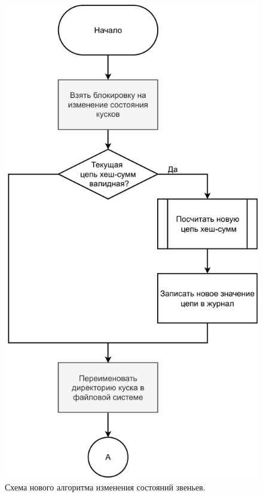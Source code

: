 \begin{figure}[hbtp]
	\centering
	\includegraphics[scale=0.8]{img/mainalgo.pdf}
	\caption{Схема нового алгоритма изменения состояний звеньев.}
	\label{fig:mainalgo}
\end{figure}
